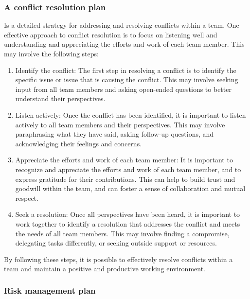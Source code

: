 \documentclass[12pt]{article}
\begin{document}
			\subsubsection{A conflict resolution plan}
				
				\quad Is a detailed strategy for addressing and resolving conflicts within a team. One effective approach to conflict resolution is to focus on listening well and understanding and appreciating the efforts and work of each team member. This may involve the following steps:
				
				\begin{enumerate}
					\item Identify the conflict: The first step in resolving a conflict is to identify the specific issue or issue that is causing the conflict. This may involve seeking input from all team members and asking open-ended questions to better understand their perspectives.
					\item Listen actively: Once the conflict has been identified, it is important to listen actively to all team members and their perspectives. This may involve paraphrasing what they have said, asking follow-up questions, and acknowledging their feelings and concerns.
					\item Appreciate the efforts and work of each team member: It is important to recognize and appreciate the efforts and work of each team member, and to express gratitude for their contributions. This can help to build trust and goodwill within the team, and can foster a sense of collaboration and mutual respect.
					\item Seek a resolution: Once all perspectives have been heard, it is important to work together to identify a resolution that addresses the conflict and meets the needs of all team members. This may involve finding a compromise, delegating tasks differently, or seeking outside support or resources.
				\end{enumerate}
					By following these steps, it is possible to effectively resolve conflicts within a team and maintain a positive and productive working environment.
			\subsubsection{Risk management plan}
			
\end{document}
